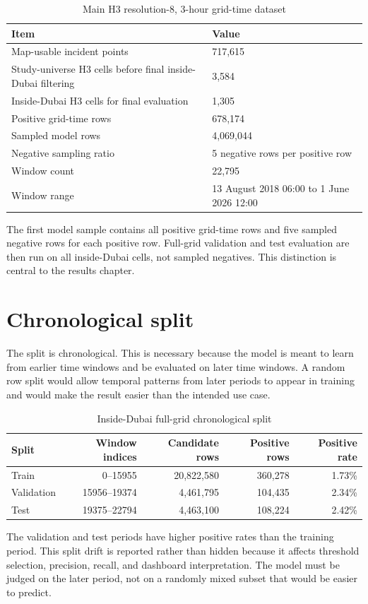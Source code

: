 \begin{table}[H]
\centering
\caption{Main H3 resolution-8, 3-hour grid-time dataset}
\label{tab:h3_grid_time_dataset}
\small
\begin{tabularx}{\textwidth}{L{0.40\textwidth}Y}
\toprule
\textbf{Item} & \textbf{Value} \\
\midrule
Map-usable incident points & 717,615 \\
Study-universe H3 cells before final inside-Dubai filtering & 3,584 \\
Inside-Dubai H3 cells for final evaluation & 1,305 \\
Positive grid-time rows & 678,174 \\
Sampled model rows & 4,069,044 \\
Negative sampling ratio & 5 negative rows per positive row \\
Window count & 22,795 \\
Window range & 13 August 2018 06:00 to 1 June 2026 12:00 \\
\bottomrule
\end{tabularx}
\end{table}

The first model sample contains all positive grid-time rows and five sampled negative rows for each positive row. Full-grid validation and test evaluation are then run on all inside-Dubai cells, not sampled negatives. This distinction is central to the results chapter.

\section{Chronological split}

The split is chronological. This is necessary because the model is meant to learn from earlier time windows and be evaluated on later time windows. A random row split would allow temporal patterns from later periods to appear in training and would make the result easier than the intended use case.

\begin{table}[H]
\centering
\caption{Inside-Dubai full-grid chronological split}
\label{tab:chronological_split}
\small
\begin{tabular}{lrrrr}
\toprule
\textbf{Split} & \textbf{Window indices} & \textbf{Candidate rows} & \textbf{Positive rows} & \textbf{Positive rate} \\
\midrule
Train & 0--15955 & 20,822,580 & 360,278 & 1.73\% \\
Validation & 15956--19374 & 4,461,795 & 104,435 & 2.34\% \\
Test & 19375--22794 & 4,463,100 & 108,224 & 2.42\% \\
\bottomrule
\end{tabular}
\end{table}

The validation and test periods have higher positive rates than the training period. This split drift is reported rather than hidden because it affects threshold selection, precision, recall, and dashboard interpretation. The model must be judged on the later period, not on a randomly mixed subset that would be easier to predict.
